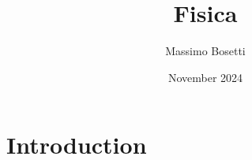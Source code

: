 \documentclass{article}
\title{Fisica}
\author{Massimo Bosetti}
\date{November 2024}
\begin{document}
\maketitle

\section{Introduction}
\end{document}
